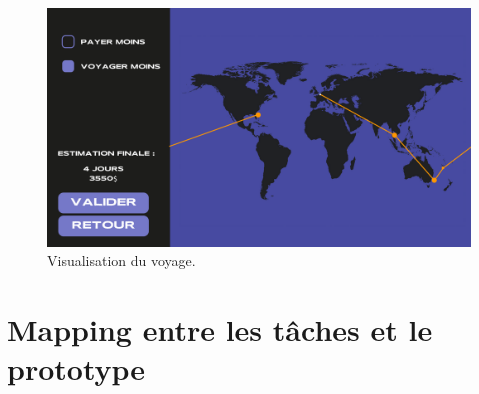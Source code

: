 \documentclass{article}
\begin{document}
\begin{figure}[!h]
	\centering
	\includegraphics[width=14.4cm]{assets/prototype/basse/onglet5}
	\caption{Visualisation du voyage.}
	\label{onglet5}
\end{figure}

\clearpage
\section{Mapping entre les tâches et le prototype}
\end{document}
